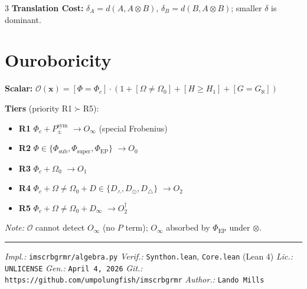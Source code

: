 \documentclass[8pt,a4paper,landscape]{article}
\begin{document}
\begin{multicols}{3}
\textbf{Translation Cost:} $\delta_A=d(A,A\otimes B)$, $\delta_B=d(B,A\otimes B)$; smaller $\delta$ is dominant.

\section*{Ouroboricity}
\footnotesize
\textbf{Scalar:} $\mathcal{O}(\mathbf{x})=[\Phi{=}\Phi_c]\cdot(1+[\Omega{\neq}\Omega_0]+[H{\ge}H_1]+[G{=}G_\aleph])$

\textbf{Tiers} (priority R1$\succ$R5):
\begin{itemize}[leftmargin=*,nosep,topsep=2pt,itemsep=1pt]
\item \textbf{R1} $\Phi_c+P_\pm^{\text{sym}}$ $\to O_\infty$ (special Frobenius)
\item \textbf{R2} $\Phi\in\{\Phi_{\text{sub}},\Phi_{\text{super}},\Phi_{\text{EP}}\}$ $\to O_0$
\item \textbf{R3} $\Phi_c+\Omega_0$ $\to O_1$
\item \textbf{R4} $\Phi_c+\Omega{\neq}\Omega_0+D\in\{D_\wedge,D_\odot,D_\triangle\}$ $\to O_2$
\item \textbf{R5} $\Phi_c+\Omega{\neq}\Omega_0+D_\infty$ $\to O_2^\dagger$
\end{itemize}
\textit{Note:} $\mathcal{O}$ cannot detect $O_\infty$ (no $P$ term); $O_\infty$ absorbed by $\Phi_{\text{EP}}$ under $\otimes$.

\end{multicols}

\vfill
\noindent\hrule
\vspace{0.1em}
\noindent\footnotesize
\textit{Impl.:} \texttt{imscrbgrmr/algebra.py} \quad
\textit{Verif.:} \texttt{Synthon.lean}, \texttt{Core.lean} (Lean 4) \quad
\textit{Lic.:} \texttt{UNLICENSE} \quad
\textit{Gen.:} \texttt{April 4, 2026} \quad
\textit{Git.:} \texttt{https://github.com/umpolungfish/imscrbgrmr} \quad
\textit{Author.:} \texttt{Lando Mills} \quad
\end{document}
